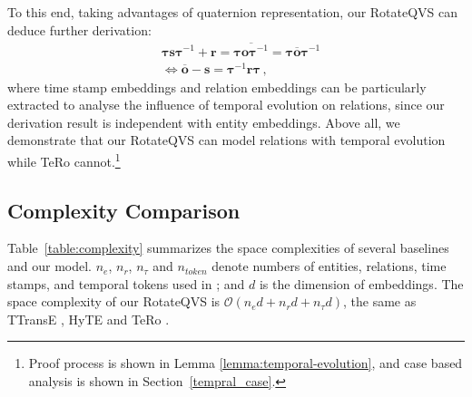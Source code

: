 \documentclass[11pt]{article}
\newcommand{\vect}[1]{\mathbf{#1}\xspace}
\newcommand{\vects}{\vect{s}\xspace}
\newcommand{\vectr}{\vect{r}\xspace}
\newcommand{\vecto}{\vect{o}\xspace}
\begin{document}
To this end, taking advantages of quaternion representation, our RotateQVS can deduce further derivation:
\begin{equation}
\begin{aligned}
& \pmb{\tau} \vects \pmb{\tau}^{-1} + \vectr = \overline{ \pmb{\tau} \vecto \pmb{\tau}^{-1}} = \pmb{\tau} \overline{\vecto} \pmb{\tau}^{-1}\\
 & \Leftrightarrow 
  \overline{\vecto} - \vects  = \pmb{\tau}^{-1} \vectr \pmb{\tau} \, , 
\end{aligned}
\end{equation}
where time stamp embeddings and relation embeddings can be particularly extracted to analyse the influence of temporal evolution on relations, since our derivation result is independent with entity embeddings.
Above all, we demonstrate that our RotateQVS can model relations with temporal evolution while TeRo cannot.\footnote{Proof process is shown in Lemma \ref{lemma:temporal-evolution}, and case based analysis is shown in Section~\ref{tempral_case}.}

\subsection{Complexity Comparison}
\label{app:complexity_comparison}


Table~\ref{table:complexity} summarizes the space complexities of several baselines and our model.
$n_e$, $n_r$, $n_{\tau}$ and $n_{token}$ denote numbers of entities, relations, time stamps, and temporal tokens used in \cite{garcia2018learning}; and $d$ is the dimension of embeddings.
The space complexity of our RotateQVS is $\mathcal{O}(n_e d + n_r d + n_{\tau} d)$, the same as TTransE \cite{leblay2018deriving}, HyTE \cite{dasgupta2018hyte} and TeRo \cite{xu2020tero}.



\begin{table}[!t]
\centering
{}
\caption{Statistics of four experimented datasets.}
\label{table:datasets}
\end{table}
\end{document}
